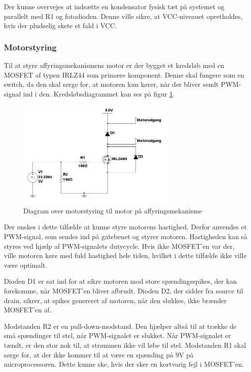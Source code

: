Der kunne overvejes at indsætte en kondensator fysisk tæt på systemet og parallelt med R1 og fotodioden. Denne ville sikre, at VCC-niveauet opretholdes, hvis der pludselig skete et fald i VCC. 

\subsubsection{Motorstyring}
Til at styre affyringsmekanismens motor er der bygget et kredsløb med en MOSFET af typen IRLZ44 som primære komponent. Denne skal fungere som en switch, da den skal sørge for, at motoren kun kører, når der bliver sendt PWM-signal ind i den. Kredsløbsdiagrammet kan ses på figur \ref{fig:affyringsmotor}. 

\begin{figure}[H]
	\centering
	\includegraphics[width=0.7\textwidth]{Afsnit/DesignOgImplementering/images/affyringsmotor}
	\caption{Diagram over motorstyring til motor på affyringsmekanisme}
	\label{fig:affyringsmotor}
\end{figure}

Der ønskes i dette tilfælde at kunne styre motorens hastighed. Derfor anvendes et PWM-signal, som sendes ind på gatebenet og styrer motoren. Hastigheden kan så styres ved hjælp af PWM-signalets dutycycle. Hvis ikke MOSFET'en var der, ville motoren køre med fuld hastighed hele tiden, hvilket i dette tilfælde ikke ville være optimalt. 

Dioden D1 er sat ind for at sikre motoren mod store spændingsspikes, der kan forekomme, når MOSFET'en bliver afbrudt. Dioden D2, der sidder fra source til drain, sikrer, at spikes genereret af motoren, når den slukkes, ikke brænder MOSFET'en af. 

Modstanden R2 er en pull-down-modstand. Den hjælper altså til at trække de små spændinger til stel, når PWM-signalet er slukket. Når PWM-signalet er tændt, er den stor nok til, at strømmen ikke vil løbe til stel. Modstanden R1 skal sørge for, at der ikke kommer til at være en spænding på 9V på microprocessoren. Dette kunne ske, hvis der sker en kortvarig fejl i MOSFET'en. 

